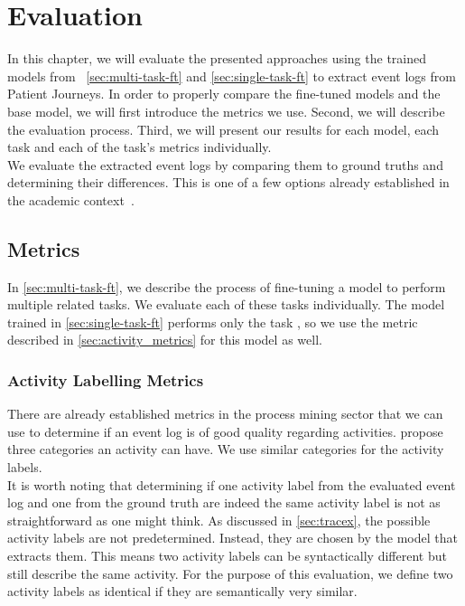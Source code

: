 \section{Evaluation}\label{sec:eval}
In this chapter, we will evaluate the presented approaches using the trained models from ~\autoref{sec:multi-task-ft} and \autoref{sec:single-task-ft} to extract event logs from Patient Journeys. In order to properly compare the fine-tuned models and the base model, we will first introduce the metrics we use. Second, we will describe the evaluation process. Third, we will present our results for each model, each task and each of the task's metrics individually.\\
We evaluate the extracted event logs by comparing them to ground truths and determining their differences. This is one of a few options already established in the academic context~\cite{latif_fine-tuning_2024}.

\subsection{Metrics}\label{sec:metrics}
In \autoref{sec:multi-task-ft}, we describe the process of fine-tuning a model to perform multiple related tasks. We evaluate each of these tasks individually. The model trained in \autoref{sec:single-task-ft} performs only the task , so we use the metric described in \autoref{sec:activity_metrics} for this model as well.

\subsubsection{Activity Labelling Metrics}\label{sec:activity_metrics}
There are already established metrics in the process mining sector that we can use to determine if an event log is of good quality regarding activities. \cite{van_der_aalst_process_2016, carmona_conformance_2018} propose three categories an activity can have. We use similar categories for the activity labels.\\
It is worth noting that determining if one activity label from the evaluated event log and one from the ground truth are indeed the same activity label is not as straightforward as one might think. As discussed in \autoref{sec:tracex}, the possible activity labels are not predetermined. Instead, they are chosen by the model that extracts them. This means two activity labels can be syntactically different but still describe the same activity. For the purpose of this evaluation, we define two activity labels as identical if they are semantically very similar.
